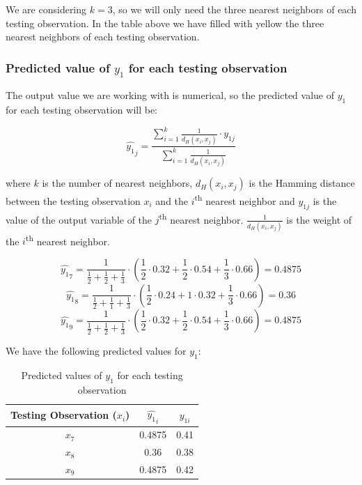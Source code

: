 \documentclass{article}
\begin{document}
We are considering $k=3$, so we will only need the three nearest neighbors of each testing observation. In the table above we have filled with yellow the three nearest neighbors of each testing observation.

\subsubsection*{Predicted value of $y_1$ for each testing observation}

The output value we are working with is numerical, so the predicted value of $y_1$ for each testing observation will be:

\[ \hat{y_1}_j = \frac{\sum_{i=1}^{k} \frac{1}{d_H(x_i,x_j)} \cdot y_{1j}}{\sum_{i=1}^{k} \frac{1}{d_H(x_i,x_j)}} \]

where $k$ is the number of nearest neighbors, $d_H(x_i,x_j)$ is the Hamming distance between the testing observation $x_i$ and the $i$\textsuperscript{th} nearest neighbor and $y_{1j}$ is the value of the output variable of the $j$\textsuperscript{th} nearest neighbor.
$\frac{1}{d_H(x_i,x_j)}$ is the weight  of the $i$\textsuperscript{th} nearest neighbor.

\[ \hat{y_1}_7 = \frac{1}{\frac{1}{2} + \frac{1}{2} + \frac{1}{3}} \cdot \left( \frac{1}{2} \cdot 0.32 + \frac{1}{2} \cdot 0.54 + \frac{1}{3} \cdot 0.66 \right) = 0.4875 \]
\[ \hat{y_1}_8 = \frac{1}{\frac{1}{2} + \frac{1}{1} + \frac{1}{3}} \cdot \left( \frac{1}{2} \cdot 0.24 + 1 \cdot 0.32 + \frac{1}{3} \cdot 0.66 \right) = 0.36 \]
\[ \hat{y_1}_9 = \frac{1}{\frac{1}{2} + \frac{1}{2} + \frac{1}{3}} \cdot \left( \frac{1}{2} \cdot 0.32 + \frac{1}{2} \cdot 0.54 + \frac{1}{3} \cdot 0.66 \right) = 0.4875 \]

We have the following predicted values for $y_1$:

\begin{table}[H]
\centering
\begin{tabular}{|c|c|c|}
  \hline
  Testing Observation ($x_i$) & $\hat{y_1}_i$ & $y_{1i}$ \\ \hline
  $x_7$                       & 0.4875        & 0.41     \\ \hline
  $x_8$                       & 0.36          & 0.38     \\ \hline
  $x_9$                       & 0.4875        & 0.42     \\ \hline
\end{tabular}
\caption{Predicted values of $y_1$ for each testing observation}
\label{tab:predicted_y1}
\end{table}
\end{document}
